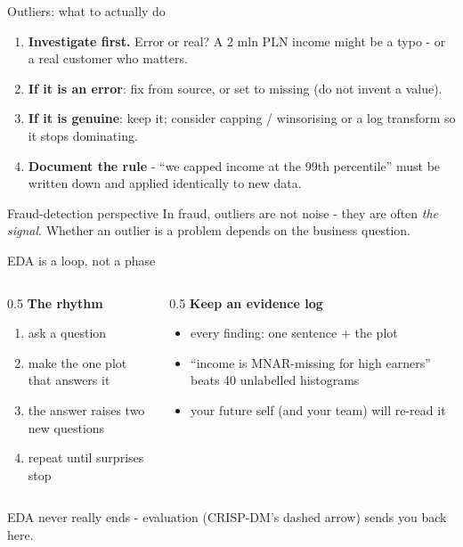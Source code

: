 \documentclass[10pt,aspectratio=169]{beamer}
\begin{document}
\begin{frame}{Outliers: what to actually do}
  \begin{enumerate}
    \item \textbf{Investigate first.} Error or real? A 2 mln PLN income might
          be a typo - or a real customer who matters.
    \item \textbf{If it is an error}: fix from source, or set to missing
          (do not invent a value).
    \item \textbf{If it is genuine}: keep it; consider capping / winsorising
          or a log transform so it stops dominating.
    \item \textbf{Document the rule} - ``we capped income at the 99th
          percentile'' must be written down and applied identically to new data.
  \end{enumerate}
  \vspace{0.5em}
  \begin{alertblock}{Fraud-detection perspective}
    In fraud, outliers are not noise - they are often \emph{the signal}.
    Whether an outlier is a problem depends on the business question.
  \end{alertblock}
\end{frame}

\begin{frame}{EDA is a loop, not a phase}
  \begin{columns}[T]
    \begin{column}{0.5\textwidth}
      \textbf{The rhythm}
      \begin{enumerate}\small
        \item ask a question
        \item make the one plot that answers it
        \item the answer raises two new questions
        \item repeat until surprises stop
      \end{enumerate}
    \end{column}
    \begin{column}{0.5\textwidth}
      \textbf{Keep an evidence log}
      \begin{itemize}\small
        \item every finding: one sentence + the plot
        \item ``income is MNAR-missing for high earners'' beats
              40 unlabelled histograms
        \item your future self (and your team) will re-read it
      \end{itemize}
    \end{column}
  \end{columns}
  \vspace{0.7em}
  \begin{center}
    EDA never really ends - evaluation (CRISP-DM's dashed arrow) sends you
    back here.
  \end{center}
\end{frame}
\end{document}
